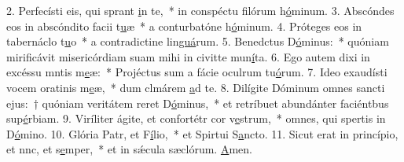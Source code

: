 2. Perfecísti eis, qui sprant \uline{i}n te,~* in conspéctu filórum h\uline{ó}minum.
3. Abscóndes eos in abscóndito facii t\uline{u}æ~* a conturbatóne h\uline{ó}minum.
4. Próteges eos in tabernáclo t\uline{u}o~* a contradictine lin\uline{guá}rum.
5. Benedctus D\uline{ó}minus:~* quóniam mirificávit misericórdiam suam mihi in civitte mun\uline{í}ta.
6. Ego autem dixi in excéssu mntis m\uline{e}æ:~* Projéctus sum a fácie oculrum tu\uline{ó}rum.
7. Ideo exaudísti vocem oratinis m\uline{e}æ,~* dum clmárem \uline{a}d te.
8. Dilígite Dóminum omnes sancti ejus:~† quóniam veritátem reret D\uline{ó}minus,~* et retríbuet abundánter faciéntbus sup\uline{é}rbiam.
9. Viríliter ágite, et confortétr cor v\uline{e}strum,~* omnes, qui spertis in D\uline{ó}mino.
10. Glória Patr, et F\uline{í}lio,~* et Spirtui S\uline{a}ncto.
11. Sicut erat in princípio, et nnc, et s\uline{e}mper,~* et in sǽcula sæclórum. \uline{A}men.
